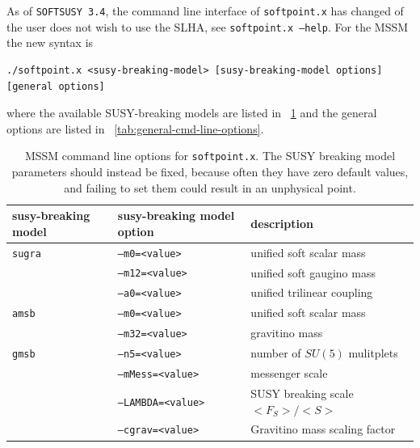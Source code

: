 \documentclass{article}
\def\code#1{\small{\tt #1}\normalsize}
\begin{document}
As of {\tt SOFTSUSY 3.4}, the command line interface of \code{softpoint.x} has 
changed of the user does not wish to use the SLHA, see \code{softpoint.x --help}.  
For the MSSM the new syntax is
\small
\begin{verbatim}
./softpoint.x <susy-breaking-model> [susy-breaking-model options] [general options]
\end{verbatim}
\normalsize
where the available SUSY-breaking models are listed in
\tablename~\ref{tab:mssm-cmd-line-options} and the general options are
listed in \tablename~\ref{tab:general-cmd-line-options}.
\begin{table}[tbh]
  \centering
  \begin{tabular}{lll}
    susy-breaking model & susy-breaking model option & description \\
    \hline
    \code{sugra} & \code{--m0=<value>} & unified soft scalar mass \\
                 & \code{--m12=<value>} & unified soft gaugino mass \\
                 & \code{--a0=<value>} & unified trilinear coupling \\
    \hline
    \code{amsb} & \code{--m0=<value>} & unified soft scalar mass \\
                & \code{--m32=<value>} & gravitino mass \\
    \hline
    \code{gmsb} & \code{--n5=<value>} & number of $SU(5)$ mulitplets \\
                & \code{--mMess=<value>} & messenger scale \\
                & \code{--LAMBDA=<value>} & SUSY breaking scale $<F_S> / <S>$ \\
                & \code{--cgrav=<value>} & Gravitino mass scaling factor \\
    \hline
  \end{tabular}
  \caption{MSSM command line options for \code{softpoint.x}.
The SUSY breaking model parameters should instead be fixed, because often they
have zero default values, and failing to set them could result in an
unphysical point.}
  \label{tab:mssm-cmd-line-options}
\end{table}
%
\end{document}
